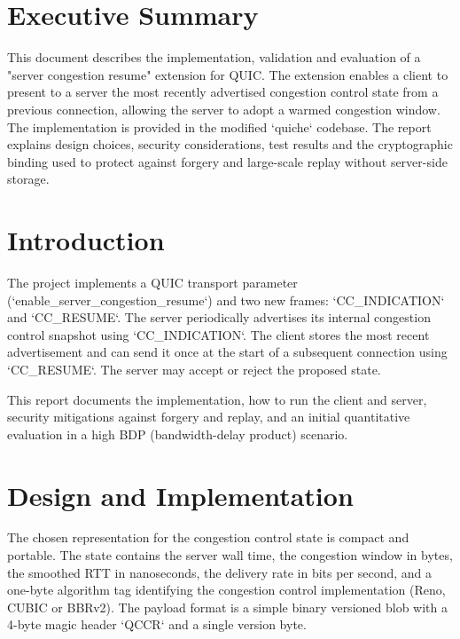 \documentclass[11pt, a4paper,titlepage]{report}
\begin{document}
\renewcommand{\labelitemi}{$\bullet$} 

\tableofcontents 

\vspace{1em}

\section*{Executive Summary}
This document describes the implementation, validation and evaluation of a
"server congestion resume" extension for QUIC. The extension enables a client
to present to a server the most recently advertised congestion control state
from a previous connection, allowing the server to adopt a warmed congestion
window. The implementation is provided in the modified `quiche` codebase. The
report explains design choices, security considerations, test results and the
cryptographic binding used to protect against forgery and large-scale replay
without server-side storage.

\section{Introduction}
The project implements a QUIC transport parameter (`enable_server_congestion_resume`)
and two new frames: `CC_INDICATION` and `CC_RESUME`. The server periodically
advertises its internal congestion control snapshot using `CC_INDICATION`. The
client stores the most recent advertisement and can send it once at the start
of a subsequent connection using `CC_RESUME`. The server may accept or reject
the proposed state.

This report documents the implementation, how to run the client and server,
security mitigations against forgery and replay, and an initial quantitative
evaluation in a high BDP (bandwidth-delay product) scenario.

\section{Design and Implementation}
The chosen representation for the congestion control state is compact and
portable. The state contains the server wall time, the congestion window in
bytes, the smoothed RTT in nanoseconds, the delivery rate in bits per second,
and a one-byte algorithm tag identifying the congestion control implementation
(Reno, CUBIC or BBRv2). The payload format is a simple binary versioned blob
with a 4-byte magic header `QCCR` and a single version byte.
\end{document}
